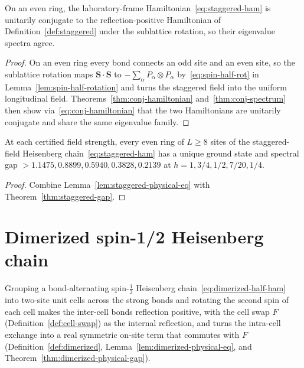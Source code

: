\begin{lemma}
  \label{lem:staggered-physical-eq}
  \leanok
  On an even ring, the laboratory-frame Hamiltonian~\eqref{eq:staggered-ham} is unitarily conjugate
  to the reflection-positive Hamiltonian of Definition~\ref{def:staggered} under the sublattice
  rotation, so their eigenvalue spectra agree.
\end{lemma}
\begin{proof}
  \leanok
  On an even ring every bond connects an odd site and an even site, so the sublattice rotation maps
  \(\mathbf S \cdot \mathbf S\) to \(-\sum_\alpha P_\alpha \otimes P_\alpha\)
  by~\eqref{eq:spin-half-rot} in Lemma~\ref{lem:spin-half-rotation} and turns the staggered field
  into the uniform longitudinal field. Theorems~\ref{thm:conj-hamiltonian}
  and~\ref{thm:conj-spectrum} then show via~\eqref{eq:conj-hamiltonian} that the two Hamiltonians
  are unitarily conjugate and share the same eigenvalue family.
\end{proof}

\begin{theorem}
  \label{thm:staggered-physical-gap}
  \leanok
  At each certified field strength, every even ring of \(L \ge 8\) sites of the staggered-field
  Heisenberg chain~\eqref{eq:staggered-ham} has a unique ground state and spectral gap
  \(> 1.1475, 0.8899, 0.5940, 0.3828, 0.2139\) at \(h = 1, 3/4, 1/2, 7/20, 1/4\).
\end{theorem}
\begin{proof}
  \leanok
  Combine Lemma~\ref{lem:staggered-physical-eq} with Theorem~\ref{thm:staggered-gap}.
\end{proof}

\section{Dimerized spin-1/2 Heisenberg chain}

Grouping a bond-alternating spin-\(\tfrac12\) Heisenberg chain~\eqref{eq:dimerized-half-ham} into
two-site unit cells across the strong bonds and rotating the second spin of each cell makes the
inter-cell bonds reflection positive, with the cell swap \(F\) (Definition~\ref{def:cell-swap}) as
the internal reflection, and turns the intra-cell exchange into a real symmetric on-site term that
commutes with \(F\) (Definition~\ref{def:dimerized}, Lemma~\ref{lem:dimerized-physical-eq}, and
Theorem~\ref{thm:dimerized-physical-gap}).

